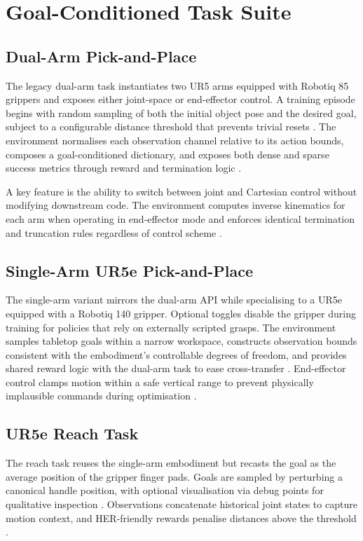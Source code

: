 \documentclass[11pt]{article}
\begin{document}
\section{Goal-Conditioned Task Suite}
\subsection{Dual-Arm Pick-and-Place}
The legacy dual-arm task instantiates two UR5 arms equipped with Robotiq 85 grippers and exposes either joint-space or end-effector control. A training episode begins with random sampling of both the initial object pose and the desired goal, subject to a configurable distance threshold that prevents trivial resets \cite{dualEnvReset}. The environment normalises each observation channel relative to its action bounds, composes a goal-conditioned dictionary, and exposes both dense and sparse success metrics through reward and termination logic \cite{dualEnvSpaces, dualEnvStep}.

A key feature is the ability to switch between joint and Cartesian control without modifying downstream code. The environment computes inverse kinematics for each arm when operating in end-effector mode and enforces identical termination and truncation rules regardless of control scheme \cite{dualEnvIK, dualEnvTermination}.

\subsection{Single-Arm UR5e Pick-and-Place}
The single-arm variant mirrors the dual-arm API while specialising to a UR5e equipped with a Robotiq 140 gripper. Optional toggles disable the gripper during training for policies that rely on externally scripted grasps. The environment samples tabletop goals within a narrow workspace, constructs observation bounds consistent with the embodiment's controllable degrees of freedom, and provides shared reward logic with the dual-arm task to ease cross-transfer \cite{singleEnvInit}. End-effector control clamps motion within a safe vertical range to prevent physically implausible commands during optimisation \cite{singleEnvControl}.

\subsection{UR5e Reach Task}
The reach task reuses the single-arm embodiment but recasts the goal as the average position of the gripper finger pads. Goals are sampled by perturbing a canonical handle position, with optional visualisation via debug points for qualitative inspection \cite{reachEnvReset}. Observations concatenate historical joint states to capture motion context, and HER-friendly rewards penalise distances above the threshold \cite{reachEnvObservation}.
\end{document}
